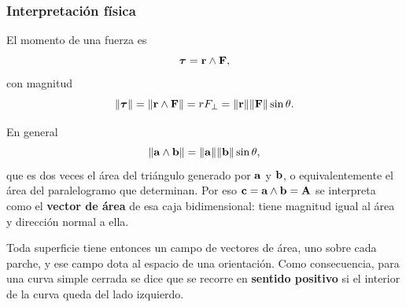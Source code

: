 \subsubsection{Interpretaci\'on f\'isica}
\label{subsubsec:torque}

El momento de una fuerza es
\begin{equation}
  \label{eq:torque}
  \boldsymbol{\tau}=\mathbf{r}\wedge\mathbf{F},
\end{equation}
con magnitud
\begin{equation}
  \label{eq:magnitud_torque}
  \lVert \boldsymbol{\tau} \rVert=\lVert \mathbf{r}\wedge\mathbf{F} \rVert
    =r F_{\perp}=\lVert \mathbf{r} \rVert\lVert \mathbf{F} \rVert\sin\theta .
\end{equation}

En general
\begin{equation}
  \label{eq:norma_cuna}
  \lVert \mathbf{a}\wedge\mathbf{b} \rVert=\lVert \mathbf{a} \rVert\lVert \mathbf{b} \rVert\sin\theta,
\end{equation}
que es dos veces el \'area del tri\'angulo generado por $\mathbf{a}$ y $\mathbf{b}$, o
equivalentemente el \'area del paralelogramo que determinan. Por eso
$\mathbf{c}=\mathbf{a}\wedge\mathbf{b}=\mathbf{A}$ se interpreta como el \textbf{vector de
\'area} de esa caja bidimensional: tiene magnitud igual al \'area y direcci\'on
normal a ella.

\begin{observacion}
  Toda superficie tiene entonces un campo de vectores de \'area, uno sobre cada
  parche, y ese campo dota al espacio de una orientaci\'on. Como consecuencia,
  para una curva simple cerrada se dice que se recorre en \textbf{sentido
  positivo} si el interior de la curva queda del lado izquierdo.
\end{observacion}
